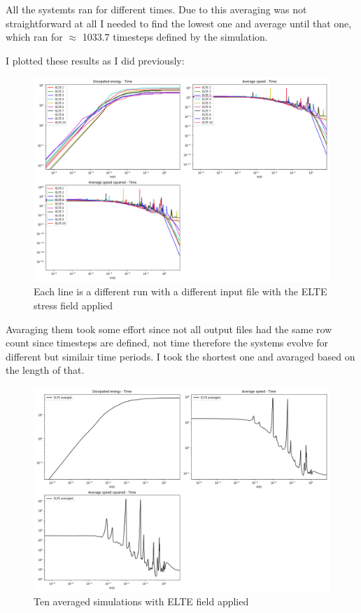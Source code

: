 \documentclass[12pt,a4paper]{article}
\theoremstyle{plain}
\begin{document}
\begin{multicols*}{2}
	\par All the systemts ran for different times. Due to this averaging was not straightforward
	at all I needed to find the lowest one and average until that one, which ran for $\approx$ 1033.7
	timesteps defined by the simulation.

	\par I plotted these results as I did previously:

	\begin{figure}[H]
		\centering
		\includegraphics[width=0.95\columnwidth]{all_elte.png}
		\caption{Each line is a different run with a different input file with the ELTE stress field applied}
	\end{figure}

	\par Avaraging them took some effort since not all output files had the same row count since
	timesteps are defined, not time therefore the systems evolve for different but similair
	time periods. I took the shortest one and avaraged based on the length of that.

	\begin{figure}[H]
		\centering
		\includegraphics[width=0.95\columnwidth]{all_elte_averaged.png}
		\caption{Ten averaged simulations with ELTE field applied}
		\label{fig:avg}
	\end{figure}


\end{multicols*}
\end{document}
